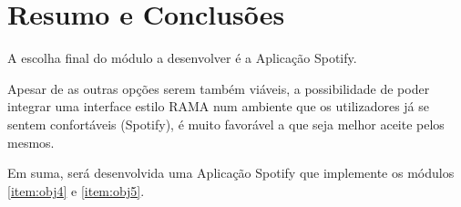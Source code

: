

\section{Resumo e Conclusões}

  A escolha final do módulo a desenvolver é a Aplicação Spotify.

  Apesar de as outras opções serem também viáveis, a possibilidade de poder integrar uma interface estilo RAMA num ambiente que os utilizadores já se sentem confortáveis (Spotify), é muito favorável a que seja melhor aceite pelos mesmos.

  Em suma, será desenvolvida uma Aplicação Spotify que implemente os módulos \ref{item:obj4} e \ref{item:obj5}.